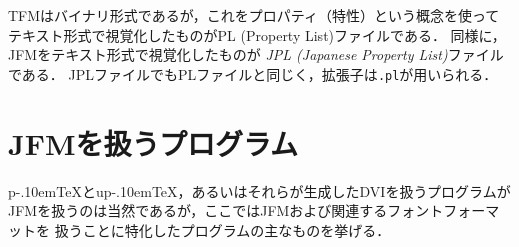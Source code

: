\documentclass[a4paper,11pt,nomag]{jsarticle}
\def\code#1{\texttt{#1}}
\def\pTeX{p\kern-.10em\TeX}\def\upTeX{u\pTeX}
\begin{document}
TFMはバイナリ形式であるが，これをプロパティ（特性）という概念を使って
テキスト形式で視覚化したものがPL (Property List)ファイルである．
同様に，JFMをテキスト形式で視覚化したものが
\emph{JPL (Japanese Property List)}ファイルである．
JPLファイルでもPLファイルと同じく，拡張子は\code{.pl}が用いられる．


\section{JFMを扱うプログラム}

\pTeX と\upTeX ，あるいはそれらが生成したDVIを扱うプログラムが
JFMを扱うのは当然であるが，ここではJFMおよび関連するフォントフォーマットを
扱うことに特化したプログラムの主なものを挙げる．





\end{document}
